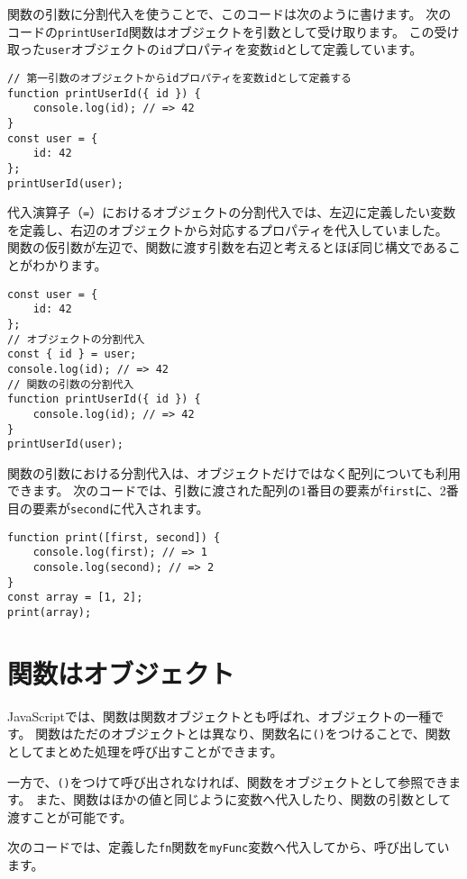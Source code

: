 関数の引数に分割代入を使うことで、このコードは次のように書けます。
次のコードの\texttt{printUserId}関数はオブジェクトを引数として受け取ります。
この受け取った\texttt{user}オブジェクトの\texttt{id}プロパティを変数\texttt{id}として定義しています。

\begin{lstlisting}
// 第一引数のオブジェクトからidプロパティを変数idとして定義する
function printUserId({ id }) {
    console.log(id); // => 42
}
const user = {
    id: 42
};
printUserId(user);
\end{lstlisting}

代入演算子（\texttt{=}）におけるオブジェクトの分割代入では、左辺に定義したい変数を定義し、右辺のオブジェクトから対応するプロパティを代入していました。
関数の仮引数が左辺で、関数に渡す引数を右辺と考えるとほぼ同じ構文であることがわかります。

\begin{lstlisting}
const user = {
    id: 42
};
// オブジェクトの分割代入
const { id } = user;
console.log(id); // => 42
// 関数の引数の分割代入
function printUserId({ id }) {
    console.log(id); // => 42
}
printUserId(user);
\end{lstlisting}

関数の引数における分割代入は、オブジェクトだけではなく配列についても利用できます。
次のコードでは、引数に渡された配列の1番目の要素が\texttt{first}に、2番目の要素が\texttt{second}に代入されます。

\begin{lstlisting}
function print([first, second]) {
    console.log(first); // => 1
    console.log(second); // => 2
}
const array = [1, 2];
print(array);
\end{lstlisting}

\hypertarget{first-class-function}{%
\section{関数はオブジェクト}\label{first-class-function}}

JavaScriptでは、関数は関数オブジェクトとも呼ばれ、オブジェクトの一種です。
関数はただのオブジェクトとは異なり、関数名に\texttt{()}をつけることで、関数としてまとめた処理を呼び出すことができます。

一方で、\texttt{()}をつけて呼び出されなければ、関数をオブジェクトとして参照できます。
また、関数はほかの値と同じように変数へ代入したり、関数の引数として渡すことが可能です。

次のコードでは、定義した\texttt{fn}関数を\texttt{myFunc}変数へ代入してから、呼び出しています。

